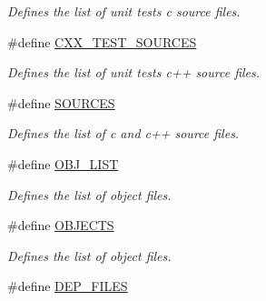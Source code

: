 \begin{DoxyCompactItemize}
\begin{DoxyCompactList}\small\item\em Defines the list of unit tests c source files. \end{DoxyCompactList}\item 
\hypertarget{group___automatic___variables_gabde2d0c19d9087032f2b1d8c16972b1e}{\#define \hyperlink{group___automatic___variables_gabde2d0c19d9087032f2b1d8c16972b1e}{C\+X\+X\+\_\+\+T\+E\+S\+T\+\_\+\+S\+O\+U\+R\+C\+E\+S}}\label{group___automatic___variables_gabde2d0c19d9087032f2b1d8c16972b1e}

\begin{DoxyCompactList}\small\item\em Defines the list of unit tests c++ source files. \end{DoxyCompactList}\item 
\hypertarget{group___automatic___variables_ga0beadd0eb153f706961cebefbb951c45}{\#define \hyperlink{group___automatic___variables_ga0beadd0eb153f706961cebefbb951c45}{S\+O\+U\+R\+C\+E\+S}}\label{group___automatic___variables_ga0beadd0eb153f706961cebefbb951c45}

\begin{DoxyCompactList}\small\item\em Defines the list of c and c++ source files. \end{DoxyCompactList}\item 
\hypertarget{group___automatic___variables_ga4a5f22a280949c97a0cb0d4213275126}{\#define \hyperlink{group___automatic___variables_ga4a5f22a280949c97a0cb0d4213275126}{O\+B\+J\+\_\+\+L\+I\+S\+T}}\label{group___automatic___variables_ga4a5f22a280949c97a0cb0d4213275126}

\begin{DoxyCompactList}\small\item\em Defines the list of object files. \end{DoxyCompactList}\item 
\hypertarget{group___automatic___variables_ga4a067492d681fbbce4157face2f51c27}{\#define \hyperlink{group___automatic___variables_ga4a067492d681fbbce4157face2f51c27}{O\+B\+J\+E\+C\+T\+S}}\label{group___automatic___variables_ga4a067492d681fbbce4157face2f51c27}

\begin{DoxyCompactList}\small\item\em Defines the list of object files. \end{DoxyCompactList}\item 
\hypertarget{group___automatic___variables_ga99aee6cf7d785eaef47006c028971a01}{\#define \hyperlink{group___automatic___variables_ga99aee6cf7d785eaef47006c028971a01}{D\+E\+P\+\_\+\+F\+I\+L\+E\+S}}\label{group___automatic___variables_ga99aee6cf7d785eaef47006c028971a01}


\end{DoxyCompactItemize}
